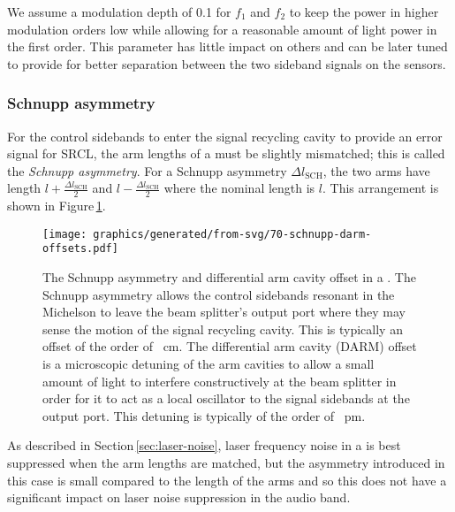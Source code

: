 We assume a modulation depth of \num{0.1} for $f_1$ and $f_2$ to keep the power in higher modulation orders low while allowing for a reasonable amount of light power in the first order. This parameter has little impact on others and can be later tuned to provide for better separation between the two sideband signals on the sensors.

\subsubsection{Schnupp asymmetry}
For the control sidebands to enter the signal recycling cavity to provide an error signal for \gls{SRCL}, the arm lengths of a \DRFPMI{} must be slightly mismatched; this is called the \emph{Schnupp asymmetry}. For a Schnupp asymmetry $\Delta l_{\text{SCH}}$, the two arms have length $l + \frac{\Delta l_{\text{SCH}}}{2}$ and $l - \frac{\Delta l_{\text{SCH}}}{2}$ where the nominal length is $l$. This arrangement is shown in Figure\,\ref{fig:schnupp-darm-offsets}.

\begin{figure}
  \centering
  \texttt{[image: graphics/generated/from-svg/70-schnupp-darm-offsets.pdf]}
  \caption[Schnupp asymmetry and differential arm cavity offset in a \DRFPMI{}]{\label{fig:schnupp-darm-offsets}The Schnupp asymmetry and differential arm cavity offset in a \DRFPMI{}. The Schnupp asymmetry allows the control sidebands resonant in the Michelson to leave the beam splitter's output port where they may sense the motion of the signal recycling cavity. This is typically an offset of the order of \SI{}{\centi\meter}. The differential arm cavity (\gls{DARM}) offset is a microscopic detuning of the arm cavities to allow a small amount of light to interfere constructively at the beam splitter in order for it to act as a local oscillator to the signal sidebands at the output port. This detuning is typically of the order of \SI{}{\pico\meter}.}
\end{figure}

As described in Section\,\ref{sec:laser-noise}, laser frequency noise in a \MI{} is best suppressed when the arm lengths are matched, but the asymmetry introduced in this case is small compared to the length of the arms and so this does not have a significant impact on laser noise suppression in the audio band.

